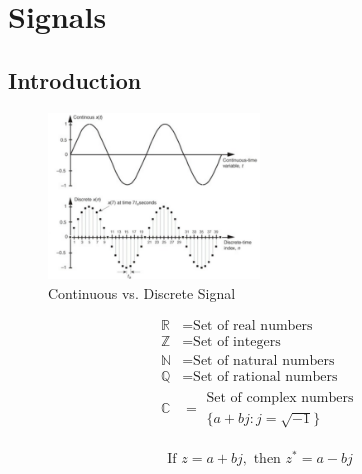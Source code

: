 \chapter{Signals}

\section{Introduction}

\begin{figure}[H]
    \centering
    \includegraphics[width=0.5\textwidth]{./LECTURE_2/audio_5.png}
    \caption{Continuous vs. Discrete Signal}
    \label{fig:signal}
\end{figure}

\begin{definition}
    \begin{align*}
        \mathbb{R} & = \text{Set of real numbers}     \\
        \mathbb{Z} & = \text{Set of integers}         \\
        \mathbb{N} & = \text{Set of natural numbers}  \\
        \mathbb{Q} & = \text{Set of rational numbers} \\
        \mathbb{C} & = \begin{aligned}
                           \text{Set of complex numbers} \\
                           \{a+bj : j = \sqrt{-1}\}
                       \end{aligned}
    \end{align*}
\end{definition}

\begin{definition}
    [Conjugate]
    \begin{align*}
        \text{If } z = a + bj, \text{ then } z^* = a - bj
    \end{align*}
\end{definition}

